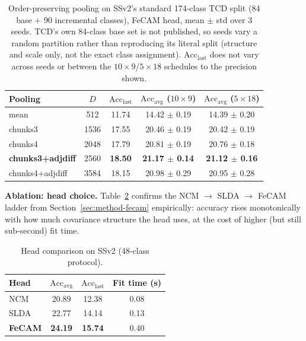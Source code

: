 \documentclass[a4paper,fleqn]{cas-dc}
\begin{document}
\begin{table}[pos=!t]
\centering
\caption{Order-preserving pooling on SSv2's standard 174-class TCD split
(84 base $+$ 90 incremental classes), FeCAM head, mean $\pm$ std over 3
seeds. TCD's own 84-class base set is not published, so seeds vary a
random partition rather than reproducing its literal split (structure and
scale only, not the exact class assignment).
$\mathrm{Acc}_{\mathrm{last}}$ does not vary across seeds or between the
$10{\times}9$/$5{\times}18$ schedules to the precision shown.}
\label{tab:ssv2-174}
\small
\begin{tabular}{@{}lcccc@{}}
\toprule
Pooling & $D$ & $\mathrm{Acc}_{\mathrm{last}}$ & $\mathrm{Acc}_{\mathrm{avg}}$ ($10{\times}9$) & $\mathrm{Acc}_{\mathrm{avg}}$ ($5{\times}18$) \\
\midrule
mean & 512 & 11.74 & 14.42 $\pm$ 0.19 & 14.39 $\pm$ 0.20 \\
chunks3 & 1536 & 17.55 & 20.46 $\pm$ 0.19 & 20.42 $\pm$ 0.19 \\
chunks4 & 2048 & 17.79 & 20.81 $\pm$ 0.19 & 20.76 $\pm$ 0.18 \\
\textbf{chunks3+adjdiff} & 2560 & \textbf{18.50} & \textbf{21.17 $\pm$ 0.14} & \textbf{21.12 $\pm$ 0.16} \\
chunks4+adjdiff & 3584 & 18.15 & 20.98 $\pm$ 0.29 & 20.95 $\pm$ 0.28 \\
\bottomrule
\end{tabular}
\end{table}

\textbf{Ablation: head choice.} Table~\ref{tab:head-ladder} confirms the
NCM $\to$ SLDA $\to$ FeCAM ladder from Section~\ref{sec:method-fecam}
empirically: accuracy rises monotonically with how much covariance
structure the head uses, at the cost of higher (but still sub-second) fit
time.

\begin{table}[pos=!htb]
\centering
\caption{Head comparison on SSv2 (48-class protocol).}
\label{tab:head-ladder}
\small
\begin{tabular}{@{}lccc@{}}
\toprule
Head & $\mathrm{Acc}_{\mathrm{avg}}$ & $\mathrm{Acc}_{\mathrm{last}}$ & Fit time (s) \\
\midrule
NCM & 20.89 & 12.38 & 0.08 \\
SLDA & 22.77 & 14.14 & 0.13 \\
\textbf{FeCAM} & \textbf{24.19} & \textbf{15.74} & 0.40 \\
\bottomrule
\end{tabular}
\end{table}
\end{document}

